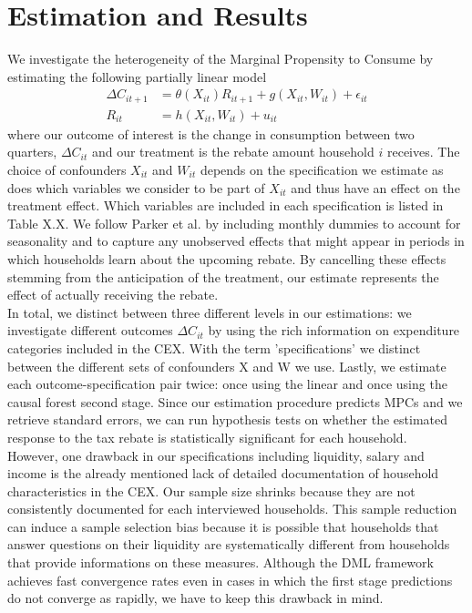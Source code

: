 \section{Estimation and Results} \label{sec:estim_res}
We investigate the heterogeneity of the Marginal Propensity to Consume by estimating the following partially linear model
\begin{align}
    \Delta C_{it+1}&=\theta(X_{it})R_{it+1}+g(X_{it}, W_{it})+\epsilon_{it} \label{eq:plm_C1}\\
    R_{it}&=h(X_{it}, W_{it})+u_{it} \label{eq:plm_C2}
\end{align}
where our outcome of interest is the change in consumption between two quarters, $\Delta C_{it}$ and our treatment is the rebate amount household $i$ receives. The choice of confounders $X_{it}$ and $W_{it}$ depends on the specification we estimate as does which variables we consider to be part of $X_{it}$ and thus have an effect on the treatment effect. Which variables are included in each specification is listed in Table X.X. We follow Parker et al. by including monthly dummies to account for seasonality and to capture any unobserved effects that might appear in periods in which households learn about the upcoming rebate. By cancelling these effects stemming from the anticipation of the treatment, our estimate represents the effect of actually receiving the rebate. \\ 
In total, we distinct between three different levels in our estimations: we investigate different outcomes $\Delta C_{it}$ by using the rich information on expenditure categories included in the CEX. With the term 'specifications' we distinct between the different sets of confounders X and W we use. Lastly, we estimate each outcome-specification pair twice: once using the linear and once using the causal forest second stage. Since our estimation procedure predicts MPCs and we retrieve standard errors, we can run hypothesis tests on whether the estimated response to the tax rebate is statistically significant for each household. \\
However, one drawback in our specifications including liquidity, salary and income is the already mentioned lack of detailed documentation of household characteristics in the CEX. Our sample size shrinks because they are not consistently documented for each interviewed households. This sample reduction can induce a sample selection bias because it is possible that households that answer questions on their liquidity are systematically different from households that provide informations on these measures. Although the DML framework achieves fast convergence rates even in cases in which the first stage predictions do not converge as rapidly, we have to keep this drawback in mind. 

